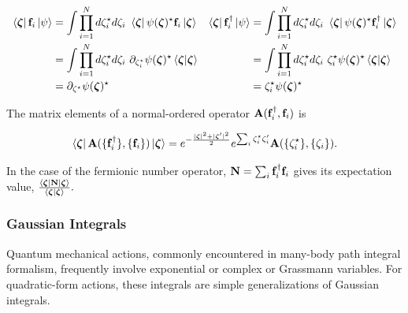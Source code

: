 \begin{equation}
\begin{array}{cc}
    \begin{split}
        \bra{\bm{\zeta}} {{\bf f}}_i \ket{\psi} &= \int \prod_{i=1}^{N} d{\zeta}^\star_i d\zeta_i \textnormal{ } \bra{\bm{\zeta}} \psi({\bm \zeta)^\star} {{\bf f}}_i \ket{\bm{\zeta}} \\
        &= \int \prod_{i=1}^{N} d{\zeta}^\star_i d\zeta_i \textnormal{ } \partial_{\zeta_i^\star} \psi({\bm \zeta)^\star} \bra{\bm{\zeta}}\ket{\bm{\zeta}} \\
        &= \partial_{{\zeta^\star}}\psi({\bm \zeta)^\star}
    \end{split} & \begin{split}
         \bra{\bm{\zeta}} {{\bf f}}_i^\dagger \ket{\psi} &= \int \prod_{i=1}^{N} d{\zeta}^\star_i d\zeta_i \textnormal{ } \bra{\bm{\zeta}} \psi({\bm \zeta)^\star} {{\bf f}}_i^\dagger \ket{\bm{\zeta}} \\
        &= \int \prod_{i=1}^{N} d{\zeta}^\star_i d\zeta_i \textnormal{ } {\zeta_i^\star} \psi({\bm \zeta)^\star} \bra{\bm{\zeta}}\ket{\bm{\zeta}} \\
        &= {\zeta_i^\star} \psi({\bm \zeta)^\star}
    \end{split}  \\
   \end{array}  
\end{equation}
   
The matrix elements of a normal-ordered operator ${\bf A}({{{\bf f}}_i^\dagger
}, {{\bf f}}_i)$ is 

$$
\bra{\bm{\zeta}} {{\bf A}}(\{{{\bf f}}_i^\dagger
\}, \{{\bf f}_i\}) \ket{\bm{\zeta}} = e^{-\frac{|\bm{\zeta}|^2 + |\bm{\zeta}'|^2}{2}} e^{\sum_{i} \zeta_i^\star \zeta_i'} {{\bf A}}(\{\zeta_i^\star\}, \{\zeta_i\}).
$$

In the case of the fermionic number operator, ${{\bf N}} = \sum_{i} {{\bf f}}_i^\dagger {{\bf f}}_i$ gives its expectation value, 
$
\frac{\bra{\bm{\zeta}} {{\bf N}} \ket{\bm{\zeta}}}{\bra{\bm{\zeta}} \ket{\bm{\zeta}}}.
$

\clearpage

\subsubsection{Gaussian Integrals}
 
Quantum mechanical actions, commonly encountered in many-body path integral formalism, frequently involve exponential or complex or Grassmann variables. For quadratic-form actions, these integrals are simple generalizations of Gaussian integrals. 

